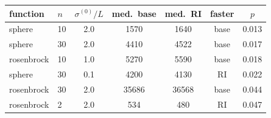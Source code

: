 \begin{tabular}{llccccc}
\toprule
function & $n$ & $\sigma^{(0)}/L$ & med.\ base & med.\ RI & faster & $p$ \\
\midrule
sphere & 10 & 2.0 & 1570 & 1640 & base & 0.013 \\
sphere & 30 & 2.0 & 4410 & 4522 & base & 0.017 \\
rosenbrock & 10 & 1.0 & 5270 & 5590 & base & 0.018 \\
sphere & 30 & 0.1 & 4200 & 4130 & RI & 0.022 \\
rosenbrock & 30 & 2.0 & 35686 & 36568 & base & 0.044 \\
rosenbrock & 2 & 2.0 & 534 & 480 & RI & 0.047 \\
\bottomrule
\end{tabular}
